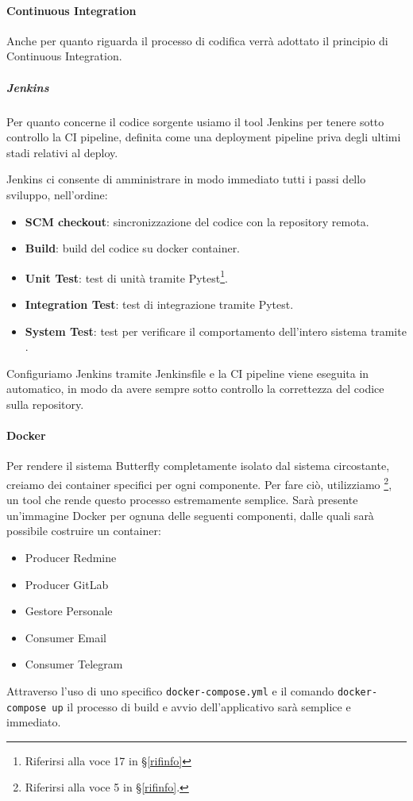 			\paragraph{Continuous Integration}\label{CI}
			Anche per quanto riguarda il processo di codifica verrà adottato il principio di Continuous Integration.

			\subparagraph{Jenkins}\label{Jenkins}
			Per quanto concerne il codice sorgente usiamo il tool Jenkins per tenere sotto controllo la CI pipeline, definita come una deployment pipeline priva degli ultimi stadi relativi al deploy.\par
			Jenkins ci consente di amministrare in modo immediato tutti i passi dello sviluppo, nell'ordine:
			\begin{itemize}
				\item \textbf{SCM checkout}: sincronizzazione del codice con la repository remota.
				\item \textbf{Build}: build del codice su docker container.
				\item \textbf{Unit Test}: test di unità tramite Pytest\footnote{Riferirsi alla voce
				17
				in \S\ref{rifinfo}}.
				\item \textbf{Integration Test}: test di integrazione tramite Pytest.
				\item \textbf{System Test}: test per verificare il comportamento dell'intero sistema tramite .
			\end{itemize}

			Configuriamo Jenkins tramite Jenkinsfile e la CI pipeline viene eseguita in automatico, in modo da avere sempre sotto controllo la correttezza del codice sulla repository.

			\paragraph{Docker}\label{Docker} %
			Per rendere il sistema Butterfly completamente isolato dal sistema circostante, creiamo dei container specifici per ogni componente. Per fare ciò, utilizziamo
			\footnote{Riferirsi alla voce
			5
			in \S\ref{rifinfo}.},
			un tool che rende questo processo estremamente semplice. Sarà presente un'immagine Docker per ognuna delle seguenti componenti, dalle quali sarà possibile costruire un container:
			\begin{itemize}
				\item Producer Redmine
				\item Producer GitLab
				\item Gestore Personale
				\item Consumer Email
				\item Consumer Telegram
			\end{itemize}
			Attraverso l'uso di uno specifico \texttt{docker-compose.yml} e il comando \texttt{docker-compose up} il processo di build e avvio dell'applicativo sarà semplice e immediato.

